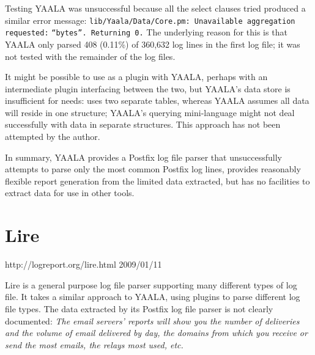 Testing YAALA was unsuccessful because all the select clauses tried
produced a similar error message:
\newline{}\tab{}\texttt{lib/Yaala/Data/Core.pm: Unavailable aggregation
requested:} \newline{}\tab{}\tab{}\texttt{``bytes''.  Returning 0.}
\newline{}  The underlying reason for this is that YAALA only parsed 408
(0.11\%) of 360,632 log lines in the first log file; it was not tested with
the remainder of the \numberOFlogFILES{} log files.

It might be possible to use \parsername{} as a plugin with YAALA, perhaps
with an intermediate plugin interfacing between the two, but YAALA's data
store is insufficient for \parsernames{} needs: \parsername{} uses two
separate tables, whereas YAALA assumes all data will reside in one
structure; YAALA's querying mini-language might not deal successfully with
data in separate structures.  This approach has not been attempted by the
author.

In summary, YAALA provides a Postfix log file parser that unsuccessfully
attempts to parse only the most common Postfix log lines, provides
reasonably flexible report generation from the limited data extracted, but
has no facilities to extract data for use in other tools.

\section{Lire}

\sloppy{}%
{http://logreport.org/lire.html}
{2009/01/11}
\fussy{}

Lire is a general purpose log file parser supporting many different types
of log file.  It takes a similar approach to YAALA, using plugins to parse
different log file types.  The data extracted by its Postfix log file
parser is not clearly documented: \textit{The email servers' reports will
show you the number of deliveries and the volume of email delivered by day,
the domains from which you receive or send the most emails, the relays most
used, etc\empty{}.\/}

